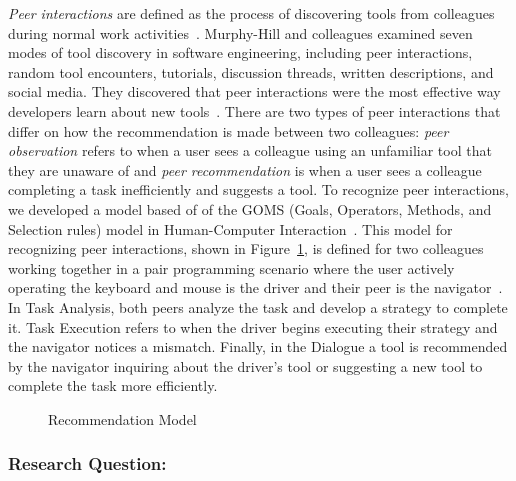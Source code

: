 \textit{Peer interactions} are defined as the process of discovering tools from colleagues during normal work activities~\cite{Murphy-Hill2011PeerInteraction}. Murphy-Hill and colleagues examined seven modes of tool discovery in software engineering, including peer interactions, random tool encounters, tutorials, discussion threads, written descriptions, and social media. They discovered that peer interactions were the most effective way developers learn about new tools~\cite{Murphy-Hill2015HowDoUsers,Murphy-Hill2011PeerInteraction}. There are two types of peer interactions that differ on how the recommendation is made between two colleagues: \textit{peer observation} refers to when a user sees a colleague using an unfamiliar tool that they are unaware of and \textit{peer recommendation} is when a user sees a colleague completing a task inefficiently and suggests a tool. To recognize peer interactions, we developed a model based of of the GOMS (Goals, Operators, Methods, and Selection rules) model in Human-Computer Interaction~\cite{diaper2003handbook}. This model for recognizing peer interactions, shown in Figure~\ref{fig:rec-model}, is defined for two colleagues working together in a pair programming scenario where the user actively operating the keyboard and mouse is the driver and their peer is the navigator~\cite{WilliamsPairProgramming}. In Task Analysis, both peers analyze the task and develop a strategy to complete it. Task Execution refers to when the driver begins executing their strategy and the navigator notices a mismatch. Finally, in the Dialogue a tool is recommended by the navigator inquiring about the driver's tool or suggesting a new tool to complete the task more efficiently.

\noindent
\begin{figure}
\centering
{}
\caption{Recommendation Model}
\label{fig:rec-model}
\end{figure}

\subsubsection{Research Question:}

